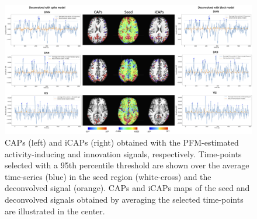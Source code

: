 \begin{figure}[H]
    \begin{center}
        \includegraphics[width=\textwidth]{figures/caps.png}
    \end{center}
    \caption{CAPs (left) and iCAPs (right) obtained with the PFM-estimated activity-inducing and innovation signals, respectively. Time-points selected with a 95th percentile threshold are shown over the average time-series (blue) in the seed region (white-cross) and the deconvolved signal (orange). CAPs and iCAPs maps of the seed and deconvolved signals obtained by averaging the selected time-points are illustrated in the center.}
\label{fig:caps}
\end{figure}

